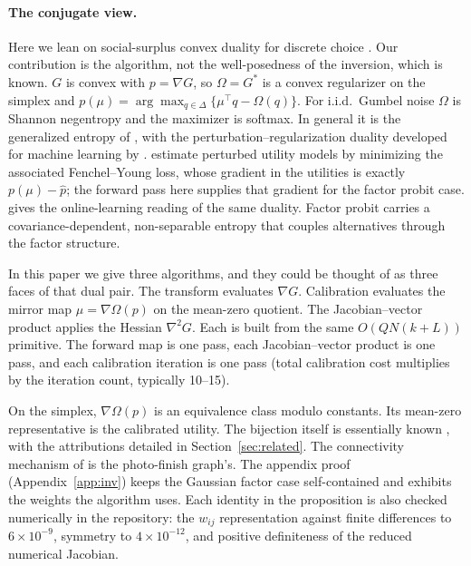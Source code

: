 \documentclass[12pt]{article}
\theoremstyle{remark}
\begin{document}
\paragraph{The conjugate view.} Here we lean on social-surplus convex
duality for discrete choice \citep{chiong2016,norets2013}. Our
contribution is the algorithm, not the well-posedness of the inversion,
which is known. $G$ is
convex with $p = \nabla G$, so $\Omega = G^*$ is a convex regularizer on
the simplex and $p(\mu) = \arg\max_{q \in \Delta}\{\mu^\top q -
\Omega(q)\}$. For i.i.d.\ Gumbel noise $\Omega$ is Shannon negentropy and
the maximizer is softmax. In general it is the generalized entropy of
\citet{fosgerau2020}, with the perturbation--regularization duality
developed for machine learning by \citet{berthet2020}.
\citet{lin2026} estimate perturbed utility models by minimizing the
associated Fenchel--Young loss, whose gradient in the utilities is
exactly $p(\mu) - \hat p$; the forward pass here supplies that
gradient for the factor probit case.
\citet{melo2025} gives the online-learning reading of the same
duality. Factor probit
carries a covariance-dependent, non-separable entropy that couples
alternatives through the factor structure. 

In this paper we give three
algorithms, and they could be thought of as three faces of that dual
pair. The transform evaluates $\nabla G$. Calibration evaluates the
mirror map $\mu = \nabla\Omega(p)$ on the mean-zero quotient. The
Jacobian--vector product applies the Hessian $\nabla^2 G$. Each is
built from the same $O(QN(k+L))$ primitive. The forward map is one
pass, each Jacobian--vector product is one pass, and each calibration
iteration is one pass (total calibration cost multiplies by the
iteration count, typically 10--15). 

On the simplex, $\nabla\Omega(p)$ is an equivalence
class modulo constants. Its mean-zero representative is the calibrated
utility. The bijection itself is essentially known
\citep{hotz1993,norets2013,bgh2013}, with the attributions detailed in
Section~\ref{sec:related}. The connectivity mechanism of
\citet{bgh2013} is the photo-finish graph's. The appendix proof (Appendix~\ref{app:inv}) keeps the
Gaussian factor case self-contained and exhibits the weights the algorithm uses. Each
identity in the proposition is also checked
numerically in the repository: the $w_{ij}$ representation against finite
differences to $6\times10^{-9}$, symmetry to $4\times10^{-12}$, and
positive definiteness of the reduced numerical Jacobian.
\end{document}
